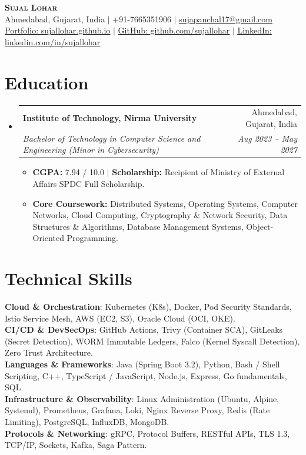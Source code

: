 \documentclass[letterpaper,10pt]{article}
\makeatletter
\newcommand{\resumeItem}[1]{
  \item\small{
    {#1 \vspace{-1.5pt}}
  }
}
\newcommand{\resumeSubheading}[4]{
  \vspace{-1pt}\item
    \begin{tabular*}{0.98\textwidth}[t]{l@{\extracolsep{\fill}}r}
      \textbf{#1} & #2 \\
      \textit{\small#3} & \textit{\small #4} \\
    \end{tabular*}\vspace{-4pt}
}
\newcommand{\resumeSubHeadingListStart}{\begin{itemize}[leftmargin=0.15in, label={}]}
\newcommand{\resumeSubHeadingListEnd}{\end{itemize}}
\newcommand{\resumeItemListStart}{\begin{itemize}[leftmargin=0.15in, label=\textbullet]}
\newcommand{\resumeItemListEnd}{\end{itemize}\vspace{-3pt}}
\makeatother
\begin{document}
\begin{center}
    \textbf{\Huge \scshape Sujal Lohar} \\ \vspace{2pt}
    \small Ahmedabad, Gujarat, India $|$ +91-7665351906 $|$ \href{mailto:sujapanchal17@gmail.com}{\underline{sujapanchal17@gmail.com}} \\ \vspace{1pt}
    \href{https://sujallohar.github.io/}{\underline{Portfolio: sujallohar.github.io}} $|$
    \href{https://github.com/sujallohar}{\underline{GitHub: github.com/sujallohar}} $|$ 
    \href{https://www.linkedin.com/in/sujallohar}{\underline{LinkedIn: linkedin.com/in/sujallohar}}
\end{center}

\section{Education}
  \resumeSubHeadingListStart
    \resumeSubheading
      {Institute of Technology, Nirma University}{Ahmedabad, Gujarat, India}
      {Bachelor of Technology in Computer Science and Engineering (Minor in Cybersecurity)}{Aug 2023 -- May 2027}
      \resumeItemListStart
        \resumeItem{\textbf{CGPA:} 7.94 / 10.0 $|$ \textbf{Scholarship:} Recipient of Ministry of External Affairs SPDC Full Scholarship.}
        \resumeItem{\textbf{Core Coursework:} Distributed Systems, Operating Systems, Computer Networks, Cloud Computing, Cryptography \& Network Security, Data Structures \& Algorithms, Database Management Systems, Object-Oriented Programming.}
      \resumeItemListEnd
  \resumeSubHeadingListEnd

\section{Technical Skills}
 \begin{itemize}[leftmargin=0.15in, label={}]
    \small{\item{
     \textbf{Cloud \& Orchestration}{: Kubernetes (K8s), Docker, Pod Security Standards, Istio Service Mesh, AWS (EC2, S3), Oracle Cloud (OCI, OKE).} \\
     \textbf{CI/CD \& DevSecOps}{: GitHub Actions, Trivy (Container SCA), GitLeaks (Secret Detection), WORM Immutable Ledgers, Falco (Kernel Syscall Detection), Zero Trust Architecture.} \\
     \textbf{Languages \& Frameworks}{: Java (Spring Boot 3.2), Python, Bash / Shell Scripting, C++, TypeScript / JavaScript, Node.js, Express, Go fundamentals, SQL.} \\
     \textbf{Infrastructure \& Observability}{: Linux Administration (Ubuntu, Alpine, Systemd), Prometheus, Grafana, Loki, Nginx Reverse Proxy, Redis (Rate Limiting), PostgreSQL, InfluxDB, MongoDB.} \\
     \textbf{Protocols \& Networking}{: gRPC, Protocol Buffers, RESTful APIs, TLS 1.3, TCP/IP, Sockets, Kafka, Saga Pattern.}
    }}
 \end{itemize}
\end{document}

